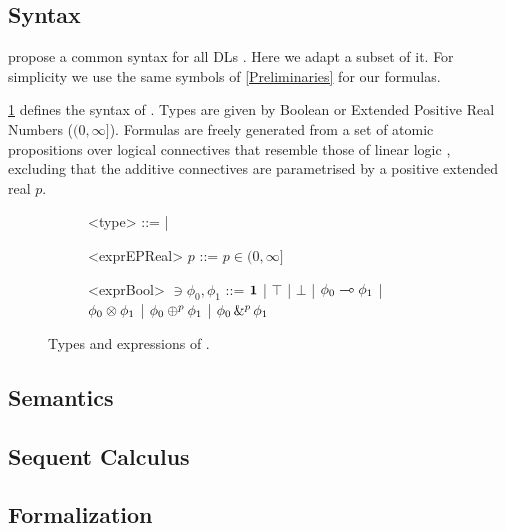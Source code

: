\subsection{Syntax}

\citeauthor{slusarz2023logic} propose a common syntax for all DLs \citep{slusarz2023logic}. Here we adapt a subset of it.  For simplicity we use the same symbols of \cref{Preliminaries} for our formulas. 

\cref{fig:syntax} defines the syntax of \OL{}. Types are given by Boolean or  Extended Positive Real Numbers ($(0,\infty]$). Formulas are freely generated from a set of atomic propositions over logical connectives that resemble those of linear logic \citep{Wadler1993, agliano2025algebraic},  excluding that the additive connectives are parametrised by a positive extended real $p$.\\

\begin{figure}[H]
\begin{subfigure}[t]{0.4\textwidth}
	\begin{grammar}
		<type> ::=  
        \BoolType | \ERealType 

        
	\end{grammar}
\end{subfigure}
\hfill
\begin{subfigure}[t]{1\textwidth}
	\begin{grammar}
		<exprEPReal> $p$ ::=  
        $p \in (0, \infty]$ 
	\end{grammar}
\end{subfigure}
\begin{subfigure}[t]{1\textwidth}
	\begin{grammar}
		<exprBool> $\ni \phi_{0},\phi_{1}$ ::=  
        $\textbf{1}$ | $\top$ | $\bot$ | $\phi_{0} \multimap{} \phi_{1}$ | $\phi_{0} \otimes{} \phi_{1}$ | $\phi_{0} \oplus^{p} \phi_{1}$ | $\phi_{0} \,\&^{p}\, \phi_{1}$ 
	\end{grammar}
\end{subfigure}
\hfill
\setlength{\belowcaptionskip}{-20pt} 
	\caption{Types and expressions of \OL{}.\\
	}
	\label{fig:syntax}
\end{figure}

\subsection{Semantics}


\subsection{Sequent Calculus}
\subsection{Formalization}

